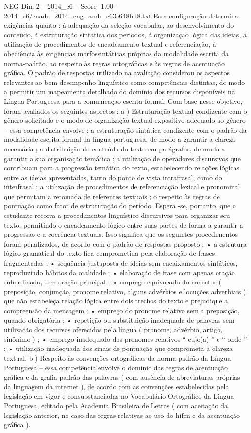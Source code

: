 \begin{textsample}{NEG Dim 2 – 2014\_c6 – Score -1.00 – 2014\_c6/enade\_2014\_eng\_amb\_c63c648bd8.txt}
Essa configuração determina exigências quanto : à adequação da seleção vocabular, ao desenvolvimento do conteúdo, à estruturação sintática dos períodos, à organização lógica das ideias, à utilização de procedimentos de encadeamento textual e referenciação, à obediência às exigências morfossintáticas próprias da modalidade escrita da norma-padrão, ao respeito às regras ortográficas e às regras de acentuação gráfica.
O padrão de respostas utilizado na avaliação considerou os aspectos relevantes ao bom desempenho linguístico como competências distintas, de modo a permitir um mapeamento detalhado do domínio dos recursos disponíveis na Língua Portuguesa para a comunicação escrita formal.
Com base nesse objetivo, foram avaliados os seguintes aspectos : a ) Estruturação textual condizente com o gênero solicitado e o modo de organização textual expositivo adequado ao gênero – essa competência envolve : a estruturação sintática condizente com o padrão da modalidade escrita formal da língua portuguesa, de modo a garantir a clareza necessária ; a distribuição do conteúdo do texto em parágrafos, de modo a garantir a sua organização temática ; a utilização de operadores discursivos que contribuam para a progressão temática do texto, estabelecendo relações lógicas entre as ideias apresentadas, tanto do ponto de vista intrafrasal, como do interfrasal ; a utilização de procedimentos de referenciação lexical e pronominal que permitam a retomada de referentes textuais ; o respeito às regras de pontuação como fator de estruturação do período.
Espera -se, portanto, que o estudante recorra a procedimentos linguístico-discursivos para organizar seu texto, permitindo o encadeamento lógico entre suas partes de forma a garantir a progressão e a coerência textuais.
Isso significa que os seguintes procedimentos foram penalizados, de acordo com o padrão de respostas proposto : • a estrutura lógico-gramatical do texto fica comprometida pela elaboração de frases fragmentadas ; • sequência justaposta de ideias sem encaixamentos sintáticos, reproduzindo hábitos da oralidade ; • elaboração de frase com apenas oração subordinada, sem oração principal ; • emprego equivocado do conector ( preposição, conjunção, pronome relativo, alguns advérbios e locuções adverbiais ) que não estabeleça relação lógica entre dois trechos do texto e prejudique a compreensão da mensagem ; • emprego do pronome relativo sem a preposição, quando obrigatória ; • repetição ou substituição inadequada de palavras sem utilização dos recursos oferecidos pela língua ( pronome, advérbio, artigo, sinônimo ) ; • emprego inadequado dos pronomes relativos “ cujo(a) ” e “ onde ” ; • utilização inadequada dos sinais de pontuação que comprometa a clareza textual. b ) Respeito às convenções ortográficas da norma-padrão da Língua Portuguesa – essa competência envolve o domínio das regras de acentuação gráfica e da grafia padrão das palavras ( com ausência de abreviaturas próprias da linguagem da internet ), de acordo com as convenções estabelecidas pela legislação em vigor e consubstanciadas no Vocabulário Ortográfico da Língua Portuguesa, editado pela Academia Brasileira de Letras ( com aceitação da legislação anterior, no caso das regras relativas ao uso do hífen e da acentuação gráfica ).

\end{textsample}
